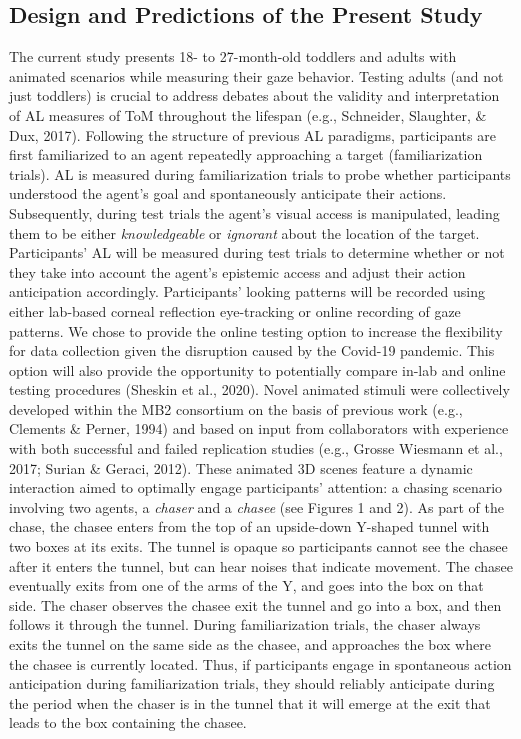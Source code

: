 \documentclass[
  english,
  man,floatsintext]{apa6}
\begin{document}
\hypertarget{design-and-predictions-of-the-present-study}{%
\subsection{Design and Predictions of the Present Study}\label{design-and-predictions-of-the-present-study}}

The current study presents 18- to 27-month-old toddlers and adults with animated scenarios while measuring their gaze behavior. Testing adults (and not just toddlers) is crucial to address debates about the validity and interpretation of AL measures of ToM throughout the lifespan (e.g., Schneider, Slaughter, \& Dux, 2017). Following the structure of previous AL paradigms, participants are first familiarized to an agent repeatedly approaching a target (familiarization trials). AL is measured during familiarization trials to probe whether participants understood the agent's goal and spontaneously anticipate their actions. Subsequently, during test trials the agent's visual access is manipulated, leading them to be either \emph{knowledgeable} or \emph{ignorant} about the location of the target. Participants' AL will be measured during test trials to determine whether or not they take into account the agent's epistemic access and adjust their action anticipation accordingly. Participants' looking patterns will be recorded using either lab-based corneal reflection eye-tracking or online recording of gaze patterns. We chose to provide the online testing option to increase the flexibility for data collection given the disruption caused by the Covid-19 pandemic. This option will also provide the opportunity to potentially compare in-lab and online testing procedures (Sheskin et al., 2020).
Novel animated stimuli were collectively developed within the MB2 consortium on the basis of previous work (e.g., Clements \& Perner, 1994) and based on input from collaborators with experience with both successful and failed replication studies (e.g., Grosse Wiesmann et al., 2017; Surian \& Geraci, 2012). These animated 3D scenes feature a dynamic interaction aimed to optimally engage participants' attention: a chasing scenario involving two agents, a \emph{chaser} and a \emph{chasee} (see Figures 1 and 2). As part of the chase, the chasee enters from the top of an upside-down Y-shaped tunnel with two boxes at its exits. The tunnel is opaque so participants cannot see the chasee after it enters the tunnel, but can hear noises that indicate movement. The chasee eventually exits from one of the arms of the Y, and goes into the box on that side. The chaser observes the chasee exit the tunnel and go into a box, and then follows it through the tunnel. During familiarization trials, the chaser always exits the tunnel on the same side as the chasee, and approaches the box where the chasee is currently located. Thus, if participants engage in spontaneous action anticipation during familiarization trials, they should reliably anticipate during the period when the chaser is in the tunnel that it will emerge at the exit that leads to the box containing the chasee.
\end{document}
